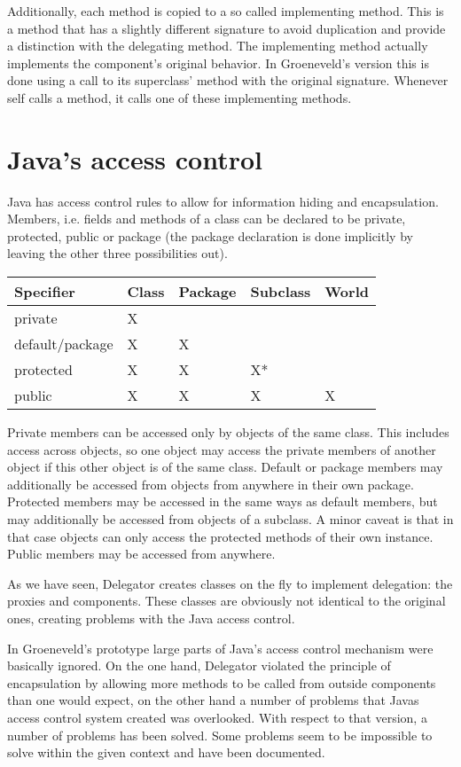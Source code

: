 \documentclass[a4paper,12pt]{book}
\begin{document}
Additionally, each method is copied to a so called implementing method. This is a method that has a slightly different signature to avoid duplication and provide a distinction with the delegating method. The implementing method actually implements the component's original behavior. In Groeneveld's version this is done using a call to its superclass' method with the original signature. Whenever self calls a method, it calls one of these implementing methods. 


\chapter{Java's access control}
Java has access control rules to allow for information hiding and encapsulation. Members, i.e. fields and methods of a class can be declared to be private, protected, public or package (the package declaration is done implicitly by leaving the other three possibilities out).

\begin{tabular}
{|l|llll|}
\hline
Specifier&Class&Package&Subclass&World\\
\hline
private&X&&&\\
default/package&X&X&&\\
protected&X&X&X*&\\		
public&X&X&X&X\\
\hline
\end{tabular} 
Private members can be accessed only by objects of the same class. This includes access across objects, so one object may access the private members of another object if this other object is of the same class. Default or package members may additionally be accessed from objects from anywhere in their own package. Protected members may be accessed in the same ways as default members, but may additionally be accessed from objects of a subclass. A minor caveat is that in that case objects can only access the protected methods of their own instance. Public members may be accessed from anywhere. 

As we have seen, Delegator creates classes on the fly to implement delegation: the proxies and components. These classes are obviously not identical to the original ones, creating problems with the Java access control. 

In Groeneveld's prototype large parts of Java's access control mechanism were basically ignored. On the one hand, Delegator violated the principle of encapsulation by allowing more methods to be called from outside components than one would expect, on the other hand a number of problems that Javas access control system created was overlooked. With respect to that version, a number of problems has been solved. Some problems seem to be impossible to solve within the given context and have been documented.
\end{document}
